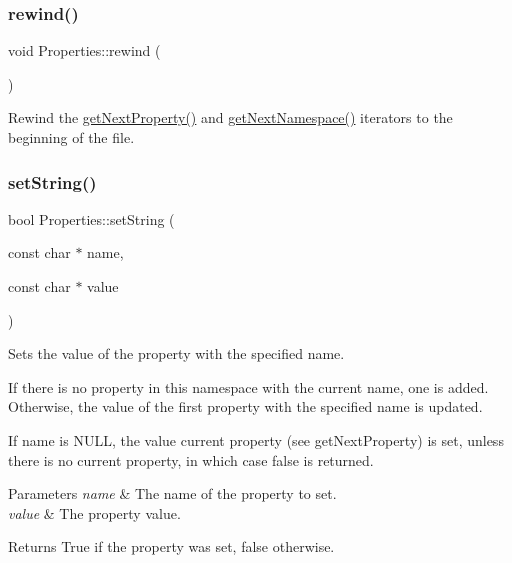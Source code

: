 \subsubsection{\texorpdfstring{rewind()}{rewind()}\hspace{0.1cm}{\footnotesize\ttfamily [2/2]}}
{\footnotesize\ttfamily void Properties\+::rewind (\begin{DoxyParamCaption}{ }\end{DoxyParamCaption})}

Rewind the \hyperlink{classProperties_a396aad2d114059ca157db26c511da196}{get\+Next\+Property()} and \hyperlink{classProperties_af3933a1797582540f81ef13a981801d3}{get\+Next\+Namespace()} iterators to the beginning of the file. \mbox{\label{classProperties_a12c91d3c681f9ace304ac5e48e804cad}} 
\subsubsection{\texorpdfstring{set\+String()}{setString()}\hspace{0.1cm}{\footnotesize\ttfamily [1/2]}}
{\footnotesize\ttfamily bool Properties\+::set\+String (\begin{DoxyParamCaption}\item[{const char $\ast$}]{name,  }\item[{const char $\ast$}]{value }\end{DoxyParamCaption})}

Sets the value of the property with the specified name.

If there is no property in this namespace with the current name, one is added. Otherwise, the value of the first property with the specified name is updated.

If name is N\+U\+LL, the value current property (see get\+Next\+Property) is set, unless there is no current property, in which case false is returned.


\begin{DoxyParams}{Parameters}
{\em name} & The name of the property to set. \\
\hline
{\em value} & The property value.\\
\hline
\end{DoxyParams}
\begin{DoxyReturn}{Returns}
True if the property was set, false otherwise. 
\end{DoxyReturn}
\mbox{\label{classProperties_a12c91d3c681f9ace304ac5e48e804cad}} 

